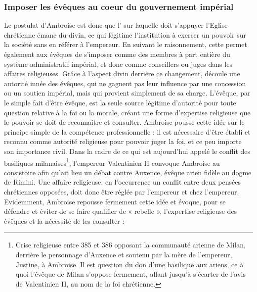 \bigskip

\subsubsection{Imposer les évêques au coeur du gouvernement impérial}

Le postulat d’Ambroise est donc que l’ sur laquelle doit s’appuyer l’Eglise chrétienne émane du divin, ce qui légitime l’institution à exercer un pouvoir sur la société sans en référer à l’empereur. En suivant le raisonnement, cette  permet également aux évêques de s’imposer comme des membres à part entière du système administratif impérial, et donc comme conseillers ou juges dans les affaires religieuses. Grâce à l’aspect divin derrière ce changement, découle une autorité innée des évêques, qui ne gagnent pas leur influence par une concession ou un soutien impérial, mais qui provient simplement de sa charge. L’évêque, par le simple fait d’être évêque, est la seule source légitime d’autorité pour toute question relative à la foi ou la morale, créant une forme d'expertise religieuse que le pouvoir se doit de reconnaître et consulter. Ambroise pousse cette idée sur le principe simple de la compétence professionnelle : il est nécessaire d’être établi et reconnu comme autorité religieuse pour pouvoir juger la foi, et ce peu importe son importance civil. Dans la cadre de ce qui est aujourd’hui appelé le conflit des basiliques milanaises\footnote{Crise religieuse entre 385 et 386 opposant la communauté arienne de Milan, derrière le personnage d’Auxence et soutenu par la mère de l’empereur, Justine, à Ambroise. Il est question du don d’une basilique aux ariens, ce à quoi l’évêque de Milan s’oppose fermement, allant jusqu’à s’écarter de l’avis de Valentinien II, au nom de la foi chrétienne.}, l’empereur Valentinien II convoque Ambroise au consistoire afin qu'ait lieu un débat contre Auxence, évêque arien fidèle au dogme de Rimini. Une affaire religieuse, en l'occurrence un conflit entre deux pensées chrétiennes opposées, doit donc être réglée par l’empereur et chez l’empereur. Evidemment, Ambroise repousse fermement cette idée et évoque, pour se défendre et éviter de se faire qualifier de « rebelle », l’expertise religieuse des évêques et la nécessité de les consulter :

\bigskip


